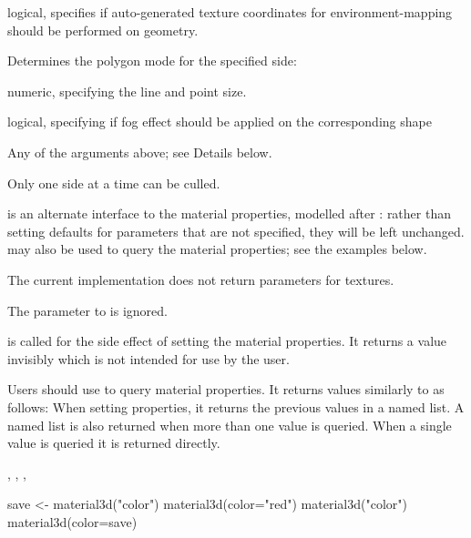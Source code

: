 \begin{Arguments}
\begin{ldescription}
\item[\code{texenvmap}] logical, specifies if auto-generated texture coordinates for environment-mapping 
should be performed on geometry.

\item[\code{front, back}] Determines the polygon mode for the specified side:

\item[\code{size}] numeric, specifying the line and point size.

\item[\code{fog}] logical, specifying if fog effect should be applied on the corresponding shape
\item[\code{...}] Any of the arguments above; see Details below.
\end{ldescription}
\end{Arguments}
\begin{Details}\relax
Only one side at a time can be culled.

 is an alternate interface to the material properties, modelled after
:  rather than setting defaults for parameters that are not specified, 
they will be left unchanged.   may also be used to query the material
properties; see the examples below.

The current implementation does not return parameters for textures.

The  parameter to  is ignored.
\end{Details}
\begin{Value}
 is called for the side effect of setting the material properties.
It returns a value invisibly which is not intended for use by the user.

Users should use  to query material properties.  It returns values similarly
to  as follows:
When setting properties, it returns the previous values in a named list.  A named list is also
returned when more than one value is queried.  When a single value is queried it is returned 
directly.
\end{Value}
\begin{SeeAlso}\relax
{},
,
,
\end{SeeAlso}
\begin{Examples}
\begin{ExampleCode}
save <- material3d("color")
material3d(color="red")
material3d("color")
material3d(color=save)
\end{ExampleCode}
\end{Examples}

